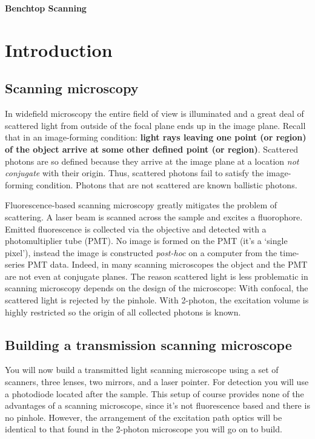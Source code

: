 \documentclass[a4paper]{report}
\begin{document}
\setcounter{secnumdepth}{2}

\begin{center}
\textbf{\Large{Benchtop Scanning}}
\end{center}

\section{Introduction}

\subsection{Scanning microscopy}
In widefield microscopy the entire field of view is illuminated and a great deal of scattered light from outside of the focal plane ends up in the image plane. 
Recall that in an image-forming condition: \textbf{light rays leaving one point (or region) of the object arrive at some other defined point (or region)}.
Scattered photons are so defined because they arrive at the image plane at a location \textit{not conjugate} with their origin.
Thus, scattered photons fail to satisfy the image-forming condition. 
Photons that are not scattered are known ballistic photons. 

Fluorescence-based scanning microscopy greatly mitigates the problem of scattering. 
A laser beam is scanned across the sample and excites a fluorophore. 
Emitted fluorescence is collected via the objective and detected with a photomultiplier tube (PMT). 
No image is formed on the PMT (it's a `single pixel'), instead the image is constructed \textit{post-hoc} on a computer from the time-series PMT data.
Indeed, in many scanning microscopes the object and the PMT are not even at conjugate planes.
The reason scattered light is less problematic in scanning microscopy depends on the design of the microscope:
With confocal, the scattered light is rejected by the pinhole. 
With 2-photon, the excitation volume is highly restricted so the origin of all collected photons is known. 




\subsection{Building a transmission scanning microscope}
You will now build a transmitted light scanning microscope using a set of scanners, three lenses, two mirrors, and a laser pointer.
For detection you will use a photodiode located after the sample. 
This setup of course provides none of the advantages of a scanning microscope, since it's not fluorescence based and there is no pinhole. 
However, the arrangement of the excitation path optics will be identical to that found in the 2-photon microscope you will go on to build. 
\end{document}
